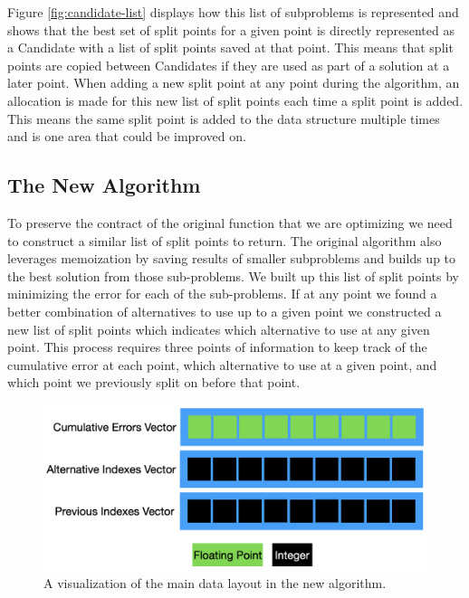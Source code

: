 \documentclass{article}
\begin{document}
Figure \ref{fig:candidate-list} displays how this list of subproblems is represented and shows that the best set of split points for a given point is directly represented as a Candidate with a list of split points saved at that point. This means that split points are copied between Candidates if they are used as part of a solution at a later point. When adding a new split point at any point during the algorithm, an allocation is made for this new list of split points each time a split point is added. This means the same split point is added to the data structure multiple times and is one area that could be improved on.

\subsection{The New Algorithm}

To preserve the contract of the original function that we are optimizing we need to construct a similar list of split points to return. The original algorithm also leverages memoization by saving results of smaller subproblems and builds up to the best solution from those sub-problems. We built up this list of split points by minimizing the error for each of the sub-problems. If at any point we found a better combination of alternatives to use up to a given point we constructed a new list of split points which indicates which alternative to use at any given point. This process requires three points of information to keep track of the cumulative error at each point, which alternative to use at a given point, and which point we previously split on before that point.

\begin{figure}[htbp]
\begin{center}
\includegraphics[scale=0.5]{vectors.png}
\caption{A visualization of the main data layout in the new algorithm.}
\label{fig:vectors}
\end{center}
\end{figure}
\end{document}
